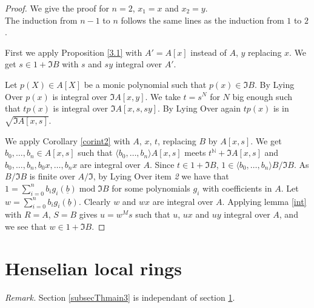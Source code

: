 \documentclass[11pt,a4paper,twoside]{article}
\newcommand \und[1]{\underline{#1}}
\newcommand \NN{\mathbb{N}}
\newcommand{\gothic}{\mathfrak}
\newcommand{\fI}{{\gothic I}}
\newcommand\gen[1]{{\langle #1 \rangle}}
\newcommand{\mod}{\;\mathrm{mod}\;}
\begin{document}

%
\begin{proof} We give the proof for $n=2$, $x_1=x$ and $x_2=y$. \\
The induction from $n-1$ to $n$ follows the same lines as the induction from $1$ to $2$.

\noindent 
First we apply Proposition \ref{3.1} with $A'=A[x]$ instead of $A$, $y$ replacing $x$. We get $s\in 1+\fI B$ with $s$ and $sy$ integral over $A'$.

\noindent   Let $p(X)\in A[X]$ be a monic polynomial such that $p(x)\in \fI B$.
By Lying Over $p(x)$ is integral over $\fI A[x,y]$. We take $t=s^N$ for $N$ big enough such that $tp(x)$ is integral over $\fI A[x,s,sy]$. By Lying Over again
$tp(x)$ is in $\sqrt{\fI A[x,s]}$. 


\noindent 
We apply Corollary \ref{corint2} with $A$, $x$, $t$, replacing $B$ by $A[x,s]$.  
We get  $b_0,\dots,b_n\in A[x,s]$
such that $\gen{b_0,\dots,b_n}A[x,s]$ meets
$t^{\NN} + \fI A[x,s]$ and $b_0,\dots,b_n,b_0x,\dots,b_nx$ are integral
over $A$. Since $t\in 1+\fI B$, $1\in \gen{b_0,\dots,b_n}B/\fI B$. As
$B/\fI B$ is finite over $A/\fI$, by Lying Over item \emph{2} we have
that $1=\sum_{i=0}^nb_ig_i(\und b) \mod \fI B$ for some polynomials $g_i$ with coefficients in $A$. 
Let $w=\sum_{i=0}^nb_ig_i(\und b)$. Clearly $w$ and $wx$ are integral over $A$.
Applying lemma \ref{int} with $R=A$, $S=B$ gives $u=w^Ms$ such
that $u$, $ux$ and $uy$ integral over $A$, and we see that $w\in 1+\fI B$. 
\end{proof}
% 











\section{Henselian local rings}\label{secHLR}
 

\noindent \emph{Remark.} Section \ref{subsecThmain3} 
is independant of section \ref{secHLR}.

\end{document}
